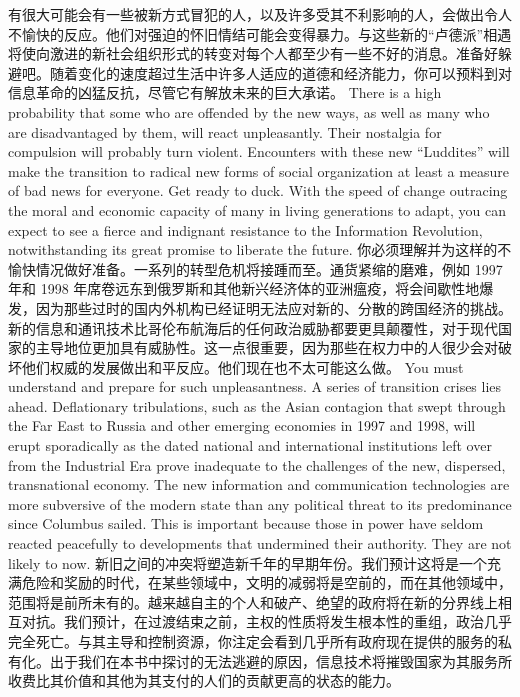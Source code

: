 \begin{paracol}{2}[]
\switchcolumn*
有很大可能会有一些被新方式冒犯的人，以及许多受其不利影响的人，会做出令人不愉快的反应。他们对强迫的怀旧情结可能会变得暴力。与这些新的“卢德派”相遇将使向激进的新社会组织形式的转变对每个人都至少有一些不好的消息。准备好躲避吧。随着变化的速度超过生活中许多人适应的道德和经济能力，你可以预料到对信息革命的凶猛反抗，尽管它有解放未来的巨大承诺。
\switchcolumn
There is a high probability that some who are offended by the new ways, as well as many who are disadvantaged by them, will react unpleasantly. Their nostalgia for compulsion will probably turn violent. Encounters with these new ``Luddites'' will make the transition to radical new forms of social organization at least a measure of bad news for everyone. Get ready to duck. With the speed of change outracing the moral and economic capacity of many in living generations to adapt, you can expect to see a fierce and indignant resistance to the Information Revolution, notwithstanding its great promise to liberate the future.
\switchcolumn*
你必须理解并为这样的不愉快情况做好准备。一系列的转型危机将接踵而至。通货紧缩的磨难，例如 1997 年和 1998 年席卷远东到俄罗斯和其他新兴经济体的亚洲瘟疫，将会间歇性地爆发，因为那些过时的国内外机构已经证明无法应对新的、分散的跨国经济的挑战。新的信息和通讯技术比哥伦布航海后的任何政治威胁都要更具颠覆性，对于现代国家的主导地位更加具有威胁性。这一点很重要，因为那些在权力中的人很少会对破坏他们权威的发展做出和平反应。他们现在也不太可能这么做。
\switchcolumn
You must understand and prepare for such unpleasantness. A series of transition crises lies ahead. Deflationary tribulations, such as the Asian contagion that swept through the Far East to Russia and other emerging economies in 1997 and 1998, will erupt sporadically as the dated national and international institutions left over from the Industrial Era prove inadequate to the challenges of the new, dispersed, transnational economy. The new information and communication technologies are more subversive of the modern state than any political threat to its predominance since Columbus sailed. This is important because those in power have seldom reacted peacefully to developments that undermined their authority. They are not likely to now.
\switchcolumn*
新旧之间的冲突将塑造新千年的早期年份。我们预计这将是一个充满危险和奖励的时代，在某些领域中，文明的减弱将是空前的，而在其他领域中，范围将是前所未有的。越来越自主的个人和破产、绝望的政府将在新的分界线上相互对抗。我们预计，在过渡结束之前，主权的性质将发生根本性的重组，政治几乎完全死亡。与其主导和控制资源，你注定会看到几乎所有政府现在提供的服务的私有化。出于我们在本书中探讨的无法逃避的原因，信息技术将摧毁国家为其服务所收费比其价值和其他为其支付的人们的贡献更高的状态的能力。

\end{paracol}
